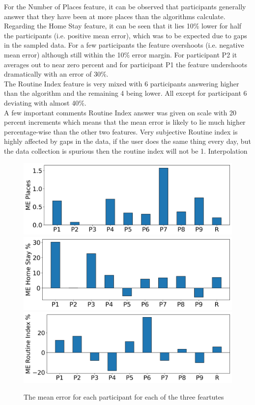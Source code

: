 For the Number of Places feature, it can be observed that participants generally answer that they have been at more places than the algorithms calculate.\\

Regarding the Home Stay feature, it can be seen that it lies 10\% lower for half the participants (i.e. positive mean error), which was to be expected due to gaps in the sampled data. For a few participants the feature overshoots (i.e. negative mean error) although still within the 10\% error margin. For participant P2 it averages out to near zero percent and for participant P1 the feature undershoots dramatically with an error of 30\%.\\

The Routine Index feature is very mixed with 6 participants answering higher than the algorithm and the remaining 4 being lower. All except for participant 6 deviating with almost 40\%.\\


A few important comments
Routine Index answer was given on scale with 20 percent increments which means that the mean error is likely to lie much higher percentage-wise than the other two features.
Very subjective
Routine index is highly affected by gaps in the data, if the user does the same thing every day, but the data collection is spurious then the routine index will not be 1.
Interpolation

\begin{figure}[h]
    \centering
    \includegraphics[width=\textwidth]{images/study/me_places.png}
    \includegraphics[width=\textwidth]{images/study/me_homestay.png}
    \includegraphics[width=\textwidth]{images/study/me_routine.png}
    \caption{The mean error for each participant for each of the three feartutes}
    \label{fig:plot-mean-error}
\end{figure}


